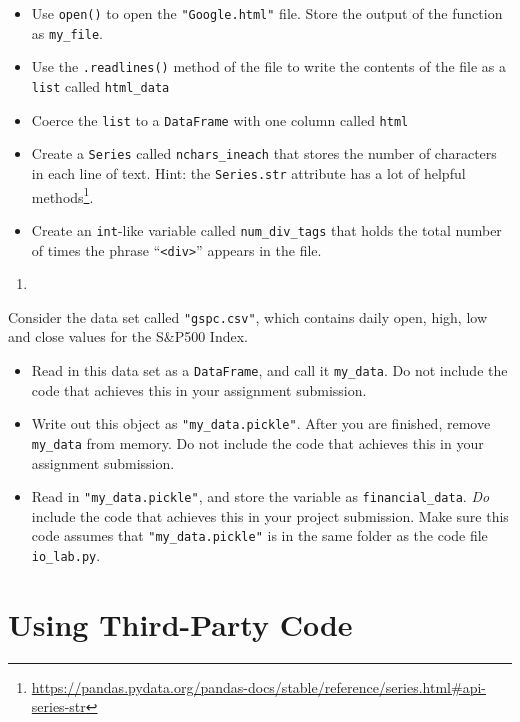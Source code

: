 \documentclass[
  12pt,
  krantz2]{krantz}
\providecommand{\tightlist}{%
  \setlength{\itemsep}{0pt}\setlength{\parskip}{0pt}}
\renewcommand{\href}[2]{#2\footnote{\url{#1}}}
\begin{document}
\begin{itemize}
\tightlist
\item
  Use \texttt{open()} to open the \texttt{"Google.html"} file. Store the output of the function as \texttt{my\_file}.
\item
  Use the \texttt{.readlines()} method of the file to write the contents of the file as a \texttt{list} called \texttt{html\_data}
\item
  Coerce the \texttt{list} to a \texttt{DataFrame} with one column called \texttt{html}
\item
  Create a \texttt{Series} called \texttt{nchars\_ineach} that stores the number of characters in each line of text. Hint: the \href{https://pandas.pydata.org/pandas-docs/stable/reference/series.html\#api-series-str}{\texttt{Series.str} attribute has a lot of helpful methods}.
\item
  Create an \texttt{int}-like variable called \texttt{num\_div\_tags} that holds the total number of times the phrase ``\texttt{\textless{}div\textgreater{}}'' appears in the file.
\end{itemize}

\begin{enumerate}
\def\labelenumi{\arabic{enumi}.}
\setcounter{enumi}{1}
\tightlist
\item
\end{enumerate}

Consider the data set called \texttt{"gspc.csv"}, which contains daily open, high, low and close values for the S\&P500 Index.

\begin{itemize}
\tightlist
\item
  Read in this data set as a \texttt{DataFrame}, and call it \texttt{my\_data}. Do not include the code that achieves this in your assignment submission.
\item
  Write out this object as \texttt{"my\_data.pickle"}. After you are finished, remove \texttt{my\_data} from memory. Do not include the code that achieves this in your assignment submission.
\item
  Read in \texttt{"my\_data.pickle"}, and store the variable as \texttt{financial\_data}. \emph{Do} include the code that achieves this in your project submission. Make sure this code assumes that \texttt{"my\_data.pickle"} is in the same folder as the code file \texttt{io\_lab.py}.
\end{itemize}

\hypertarget{using-third-party-code}{%
\chapter{Using Third-Party Code}\label{using-third-party-code}}
\end{document}
